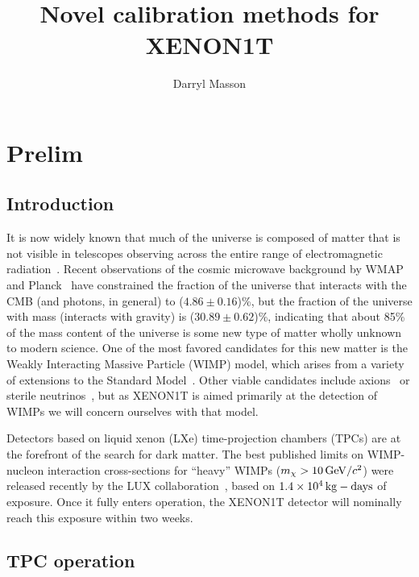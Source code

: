 \documentclass[phys,dissertation]{puthesis}
\title{
	Novel calibration methods for XENON1T
}
\author{Darryl Masson}{Masson, Darryl}
\begin{document}
\maketitle
\tableofcontents
\chapter{Prelim}
\section{Introduction}

It is now widely known that much of the universe is composed of matter that is not visible in telescopes observing across the entire range of electromagnetic radiation~\cite{Olive:2014,Blumenthal:1984,Clowe:2006eq}. Recent observations of the cosmic microwave background by WMAP~\cite{2013ApJS} and Planck~\cite{Ade:2015xua} have constrained the fraction of the universe that interacts with the CMB (and photons, in general) to ($4.86\pm0.16$)\%, but the fraction of the universe with mass (interacts with gravity) is ($30.89\pm0.62$)\%, indicating that about 85\% of the mass content of the universe is some new type of matter wholly unknown to modern science. One of the most favored candidates for this new matter is the Weakly Interacting Massive Particle (WIMP) model, which arises from a variety of extensions to the Standard Model~\cite{Jungman:1995df}. Other viable candidates include axions~\cite{2009PhRvD} or sterile neutrinos~\cite{Boyarsky:2009ix}, but as XENON1T is aimed primarily at the detection of WIMPs we will concern ourselves with that model.

Detectors based on liquid xenon (LXe) time-projection chambers (TPCs) are at the forefront of the search for dark matter. The best published limits on WIMP-nucleon interaction cross-sections for ``heavy'' WIMPs ($m_{\chi} > 10\,\mathrm{GeV}/c^2$) were released recently by the LUX collaboration~\cite{Akerib:2015rjg}, based on $1.4\times10^4\,\mathrm{kg}-\mathrm{days}$ of exposure. Once it fully enters operation, the XENON1T detector will nominally reach this exposure within two weeks.

\section{TPC operation}
\end{document}
